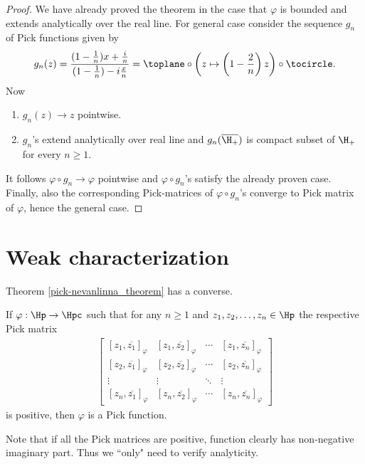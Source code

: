 \begin{proof}
	We have already proved the theorem in the case that $\varphi$ is bounded and extends analytically over the real line. For general case consider the sequence $g_{n}$ of Pick functions given by
	\[
		g_{n}(z) = \frac{(1 - \frac{1}{n})x + \frac{i}{n}}{(1 - \frac{1}{n}) - i\frac{x}{n}} = \toplane \circ \left(z \mapsto \left(1 - \frac{2}{n}\right)z\right) \circ \tocircle.
	\]
	Now
	\begin{enumerate}
		\item $g_{n}(z) \to z$ pointwise.
		\item $g_{n}$'s extend analytically over real line and $g_{n}(\overline{\H_{+}})$ is compact subset of $\H_{+}$ for every $n \geq 1$.
	\end{enumerate}
	It follows $\varphi \circ g_{n} \to \varphi$ pointwise and $\varphi \circ g_{n}$'s satisfy the already proven case. Finally, also the corresponding Pick-matrices of $\varphi \circ g_{n}$'s converge to Pick matrix of $\varphi$, hence the general case.
\end{proof}

\section{Weak characterization}

Theorem \ref{pick-nevanlinna_theorem} has a converse.

\begin{lause}\label{pick-nevanlinna_converse}
	If $\varphi : \Hp \to \Hpc$ such that for any $n \geq 1$ and $z_{1}, z_{2}, \ldots, z_{n} \in \Hp$ the respective Pick matrix
	\begin{align*}
	\begin{bmatrix}
		[z_{1}, \overline{z_{1}}]_{\varphi} & [z_{1}, \overline{z_{2}}]_{\varphi} & \cdots & [z_{1}, \overline{z_{n}}]_{\varphi} \\
		[z_{2}, \overline{z_{1}}]_{\varphi} & [z_{2}, \overline{z_{2}}]_{\varphi} & \cdots & [z_{2}, \overline{z_{n}}]_{\varphi} \\
		\vdots & \vdots & \ddots & \vdots \\
		[z_{n}, \overline{z_{1}}]_{\varphi} & [z_{n}, \overline{z_{2}}]_{\varphi} & \cdots &  [z_{n}, \overline{z_{n}}]_{\varphi}
	\end{bmatrix}
	\end{align*}
	is positive, then $\varphi$ is a Pick function.
\end{lause}

Note that if all the Pick matrices are positive, function clearly has non-negative imaginary part. Thus we ``only" need to verify analyticity.

